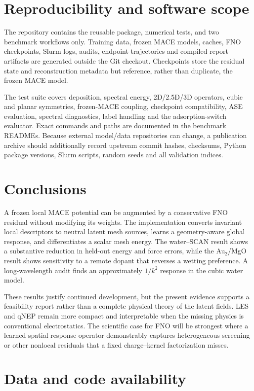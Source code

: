 \documentclass[11pt]{article}
\begin{document}
\section{Reproducibility and software scope}

The repository contains the reusable package, numerical tests, and two
benchmark workflows only. Training data, frozen MACE models, caches, FNO
checkpoints, Slurm logs, audits, endpoint trajectories and compiled report
artifacts are generated outside the Git checkout. Checkpoints store the
residual state and reconstruction metadata but reference, rather than
duplicate, the frozen MACE model.

The test suite covers deposition, spectral energy, 2D/2.5D/3D operators,
cubic and planar symmetries, frozen-MACE coupling, checkpoint compatibility,
ASE evaluation, spectral diagnostics, label handling and the
adsorption-switch evaluator. Exact commands and paths are documented in the
benchmark READMEs. Because external model/data repositories can change, a
publication archive should additionally record upstream commit hashes,
checksums, Python package versions, Slurm scripts, random seeds and all
validation indices.

\section{Conclusions}

A frozen local MACE potential can be augmented by a conservative FNO residual
without modifying its weights. The implementation converts invariant local
descriptors to neutral latent mesh sources, learns a geometry-aware global
response, and differentiates a scalar mesh energy. The water--SCAN result
shows a substantive reduction in held-out energy and force errors, while the
Au$_2$/MgO result shows sensitivity to a remote dopant that reverses a wetting
preference. A long-wavelength audit finds an approximately \(1/k^2\)
response in the cubic water model.

These results justify continued development, but the present evidence supports
a feasibility report rather than a complete physical theory of the latent
fields. LES and qNEP remain more compact and interpretable when the missing
physics is conventional electrostatics. The scientific case for FNO will be
strongest where a learned spatial response operator demonstrably captures
heterogeneous screening or other nonlocal residuals that a fixed
charge--kernel factorization misses.

\section*{Data and code availability}
\end{document}
